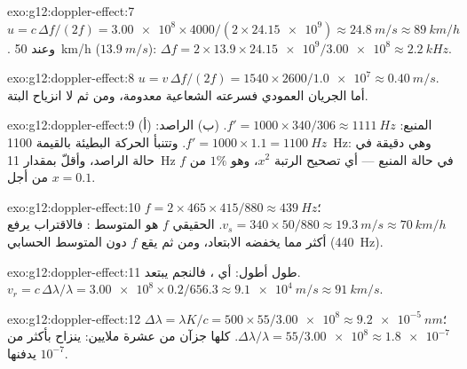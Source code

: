 \begin{solution}{exo:g12:doppler-effect:7}
$u = c\,\Delta f/(2f) = \num{3.00e8} \times 4000/(2 \times \num{24.15e9}) \approx
\qty{24.8}{m/s} \approx \qty{89}{km/h}$. وعند \qty{50}{km/h} ($\qty{13.9}{m/s}$):
$\Delta f = 2 \times 13.9 \times \num{24.15e9}/\num{3.00e8} \approx \qty{2.2}{kHz}$.
\end{solution}

\begin{solution}{exo:g12:doppler-effect:8}
$u = v\,\Delta f/(2f) = 1540 \times 2600/\num{1.0e7} \approx \qty{0.40}{m/s}$.
أما الجريان العمودي فسرعته الشعاعية معدومة، ومن ثم لا انزياح البتة.
\end{solution}

\begin{solution}{exo:g12:doppler-effect:9}
(أ) المنبع: $f' = 1000 \times 340/306 \approx \qty{1111}{Hz}$. (ب) الراصد:
$f' = 1000 \times 1.1 = \qty{1100}{Hz}$. وتتنبأ الحركة البطيئة بالقيمة \qty{1100}{Hz}: وهي دقيقة في
حالة الراصد، وأقلّ بمقدار \qty{11}{Hz} في حالة المنبع --- أي تصحيح الرتبة $x^2$، وهو $1\%$ من
$f$ من أجل $x = 0.1$.
\end{solution}

\begin{solution}{exo:g12:doppler-effect:10}
$f = 2 \times 465 \times 415/880 \approx \qty{439}{Hz}$؛
$v_s = 340 \times 50/880 \approx \qty{19.3}{m/s} \approx \qty{70}{km/h}$.  الحقيقي $f$
هو المتوسط : فالاقتراب يرفع  أكثر مما يخفضه الابتعاد، ومن ثم
يقع $f$ دون المتوسط الحسابي (\qty{440}{Hz}).
\end{solution}

\begin{solution}{exo:g12:doppler-effect:11}
طول  أطول: أي ، فالنجم يبتعد. $v_r = c\,\Delta\lambda/\lambda =
\num{3.00e8} \times 0.2/656.3 \approx \qty{9.1e4}{m/s} \approx \qty{91}{km/s}$.
\end{solution}

\begin{solution}{exo:g12:doppler-effect:12}
$\Delta\lambda = \lambda K/c = 500 \times 55/\num{3.00e8} \approx \qty{9.2e-5}{nm}$؛
$\Delta\lambda/\lambda = 55/\num{3.00e8} \approx \num{1.8e-7}$.  كلها جزآن
من عشرة ملايين:  ينزاح بأكثر من $10^{-7}$ يدفنها.
\end{solution}

